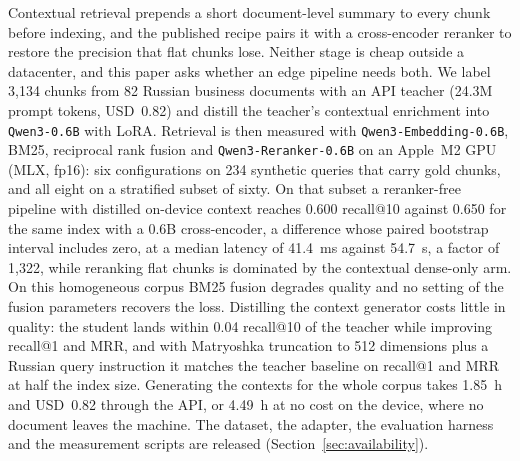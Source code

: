 Contextual retrieval prepends a short document-level summary to every chunk
before indexing, and the published recipe pairs it with a cross-encoder reranker
to restore the precision that flat chunks lose. Neither stage is cheap outside a
datacenter, and this paper asks whether an edge pipeline needs both. We label
3{,}134 chunks from 82 Russian business documents with an API teacher (24.3M
prompt tokens, USD~0.82) and distill the teacher's contextual enrichment into
\texttt{Qwen3-0.6B} with LoRA. Retrieval is then measured with
\texttt{Qwen3-Embedding-0.6B}, BM25, reciprocal rank fusion and
\texttt{Qwen3-Reranker-0.6B} on an Apple~M2 GPU (MLX, fp16): six configurations
on 234 synthetic queries that carry gold chunks, and all eight on a stratified
subset of sixty. On that subset a reranker-free pipeline with distilled
on-device context reaches 0.600 recall@10 against 0.650 for the same index with
a 0.6B cross-encoder, a difference whose paired bootstrap interval includes
zero, at a median latency of 41.4~ms against 54.7~s, a factor of 1{,}322, while
reranking flat chunks is dominated by the contextual dense-only arm. On this
homogeneous corpus BM25 fusion degrades quality and no setting of the fusion
parameters recovers the loss. Distilling the context generator costs little in
quality: the student lands within 0.04 recall@10 of the teacher while improving
recall@1 and MRR, and with Matryoshka truncation to 512 dimensions plus a
Russian query instruction it matches the teacher baseline on recall@1 and MRR at
half the index size. Generating the contexts for the whole corpus takes 1.85~h
and USD~0.82 through the API, or 4.49~h at no cost on the device, where no
document leaves the machine. The dataset, the adapter, the evaluation harness
and the measurement scripts are released (Section~\ref{sec:availability}).
